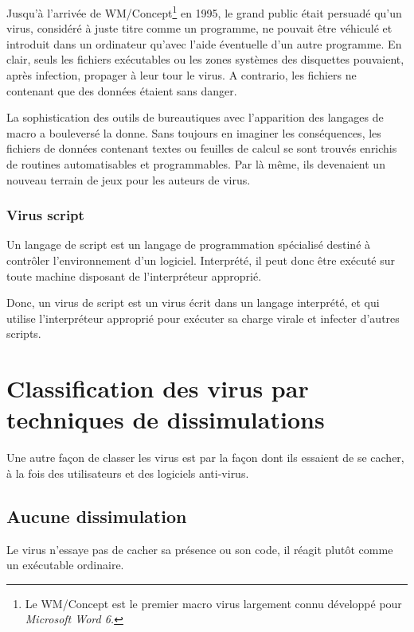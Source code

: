         Jusqu’à l’arrivée de WM/Concept\footnote{Le WM/Concept est le premier macro virus largement connu
        développé pour \emph{Microsoft Word 6.}} en 1995, le grand public était persuadé qu’un virus, 
        considéré à juste titre comme un programme, ne pouvait être véhiculé et introduit dans un ordinateur 
        qu’avec l'aide éventuelle d’un autre programme. En clair, seuls les fichiers exécutables ou les zones 
        systèmes des disquettes pouvaient, après infection, propager à leur tour le virus. 
        A contrario, les fichiers ne contenant que des données étaient sans danger. \cite{virus_informatique_article}

        La sophistication des outils de bureautiques avec l’apparition des langages de macro a bouleversé 
        la donne. Sans toujours en imaginer les conséquences, les fichiers de données contenant textes ou feuilles 
        de calcul se sont trouvés enrichis de routines automatisables et programmables. 
        Par là même, ils devenaient un nouveau terrain de jeux pour les auteurs de virus. 
        \cite{virus_informatique_article} %


        \subsubsection{Virus script}
        Un langage de script est un langage de programmation spécialisé destiné à contrôler l'environnement 
        d'un logiciel. Interprété, il peut donc être exécuté sur toute machine disposant de l'interpréteur approprié. 
        \cite{virus_informatique_article} %

        Donc, un virus de script est un virus écrit dans un langage interprété, et qui utilise l'interpréteur approprié
        pour exécuter sa charge virale et infecter d'autres scripts. %

\section{Classification des virus par techniques de dissimulations}
Une autre façon de classer les virus est par la façon dont ils essaient de se cacher, 
à la fois des utilisateurs et des logiciels anti-virus. \cite{virus} %

    \subsection{Aucune dissimulation}
    Le virus n'essaye pas de cacher sa présence ou son code, il réagit plutôt comme un exécutable ordinaire. %

